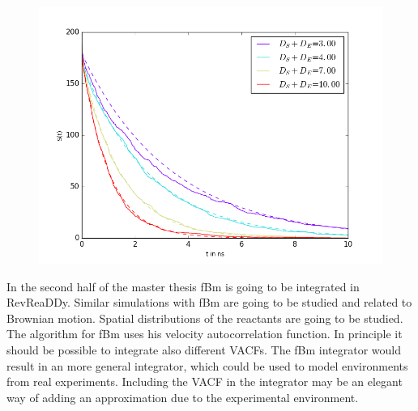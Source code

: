 \documentclass[
  a4paper,BCOR10mm,oneside,
  bibtotoc,idxtotoc,
  headsepline,footsepline,%
  fleqn,openbib
]{scrbook}
\begin{document}
\begin{figure}[h!]
  \centering
  \includegraphics[width=\linewidth]{./data/besta.png}
  \captionsetup{width=0.9\linewidth}
  \label{fig:reactionssimulation}
\end{figure}
\newline \noindent In the second half of the master thesis fBm is going to be integrated in RevReaDDy. Similar simulations with fBm are going to be studied and related to Brownian motion. Spatial distributions of the reactants are going to be studied. The algorithm for fBm uses his velocity autocorrelation function. In principle it should be possible to integrate also different VACFs. The fBm integrator would result in an more general integrator, which could be used to model environments from real experiments. Including the VACF in the integrator may be an elegant way of adding an approximation due to the experimental environment. 

%

\nocite{}



\end{document}
